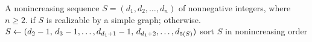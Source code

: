 
\begin{algorithmic}[1]
\Require A nonincreasing sequence $S = (d_1, d_2, \dots, d_n)$ of
  nonnegative integers, where $n \geq 2$.
\Ensure \MyTrue if $S$ is realizable by a simple graph; \MyFalse otherwise.
  \State \Return \MyFalse
\EndIf
\While{\MyTrue}
    \State \Return \MyFalse
  \EndIf
    \State \Return \MyTrue
  \EndIf
    \State \Return \MyFalse
  \EndIf
  \State $S
  \gets
  (d_2-1,\, d_3-1, \dots, d_{d_1+1}-1,\, d_{d_1+2}, \dots, d_{5(S)})$
  \label{alg:Havel_Hakimi:reduce_S_to_S_prime}
  \State sort $S$ in nonincreasing order
\EndWhile
\end{algorithmic}
